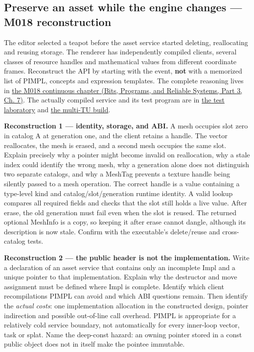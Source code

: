 \subsection{Preserve an asset while the engine changes --- M018 reconstruction}\label{appendix-960160274237-preserve-an-asset-while-the-engine-changes-m018-reconstruction}

\hypertarget{appendix-960160274237-preserve-an-asset-while-the-engine-changes-m018-reconstruction}{}

The editor selected a teapot before the asset service started deleting, reallocating and reusing storage. The renderer has independently compiled clients, several classes of resource handles and mathematical values from different coordinate frames. Reconstruct the API by starting with the event, \textbf{not} with a memorized list of PIMPL, concepts and expression templates. The complete reasoning lives in \href{../01-Bits-Programs-and-Reliable-Systems-P03/main.pdf\#01-foundations-i-ch007-a-registry-crosses-its-last-c-boundary-hidden-implementation-typed-identity-and-measured-abstraction-cost}{the M018 continuous chapter (Bits, Programs, and Reliable Systems, Part 3, Ch. 7)}. The actually compiled service and its test program are in \hyperref[source-file-8aedc3fdcd10c91971507448]{the test laboratory} and \hyperref[source-file-c936569afa19be638ec87991]{the multi-TU build}.

\textbf{Reconstruction 1 --- identity, storage, and ABI.} A mesh occupies slot zero in catalog A at generation one, and the client retains a handle. The vector reallocates, the mesh is erased, and a second mesh occupies the same slot. Explain precisely why a pointer might become invalid on reallocation, why a stale index could identify the wrong mesh, why a generation alone does not distinguish two separate catalogs, and why a MeshTag prevents a texture handle being silently passed to a mesh operation. The correct handle is a value containing a type-level kind and catalog/slot/generation runtime identity. A valid lookup compares all required fields and checks that the slot still holds a live value. After erase, the old generation must fail even when the slot is reused. The returned optional MeshInfo is a copy, so keeping it after erase cannot dangle, although its description is now stale. Confirm with the executable's delete/reuse and cross-catalog tests.

\textbf{Reconstruction 2 --- the public header is not the implementation.} Write a declaration of an asset service that contains only an incomplete Impl and a unique pointer to that implementation. Explain why the destructor and move assignment must be defined where Impl is complete. Identify which client recompilations PIMPL can avoid and which ABI questions remain. Then identify the \emph{actual costs}: one implementation allocation in the constructed design, pointer indirection and possible out-of-line call overhead. PIMPL is appropriate for a relatively cold service boundary, not automatically for every inner-loop vector, task or splat. Name the deep-const hazard: an owning pointer stored in a const public object does not in itself make the pointee immutable.

